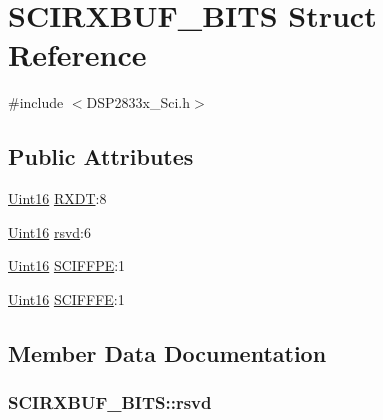 \hypertarget{struct_s_c_i_r_x_b_u_f___b_i_t_s}{}\section{S\+C\+I\+R\+X\+B\+U\+F\+\_\+\+B\+I\+T\+S Struct Reference}
\label{struct_s_c_i_r_x_b_u_f___b_i_t_s}


{\ttfamily \#include $<$D\+S\+P2833x\+\_\+\+Sci.\+h$>$}

\subsection*{Public Attributes}
\begin{DoxyCompactItemize}
\item 
\hyperlink{_d_s_p2833x___device_8h_a59a9f6be4562c327cbfb4f7e8e18f08b}{Uint16} \hyperlink{struct_s_c_i_r_x_b_u_f___b_i_t_s_ad2631cf7cb2d2416642c781944964633}{R\+X\+D\+T}\+:8
\item 
\hyperlink{_d_s_p2833x___device_8h_a59a9f6be4562c327cbfb4f7e8e18f08b}{Uint16} \hyperlink{struct_s_c_i_r_x_b_u_f___b_i_t_s_a134834a896673cca9281cb0534d024ac}{rsvd}\+:6
\item 
\hyperlink{_d_s_p2833x___device_8h_a59a9f6be4562c327cbfb4f7e8e18f08b}{Uint16} \hyperlink{struct_s_c_i_r_x_b_u_f___b_i_t_s_aa759f441f29b63c2f16820c5823a2b41}{S\+C\+I\+F\+F\+P\+E}\+:1
\item 
\hyperlink{_d_s_p2833x___device_8h_a59a9f6be4562c327cbfb4f7e8e18f08b}{Uint16} \hyperlink{struct_s_c_i_r_x_b_u_f___b_i_t_s_af6a12445c5713a479b1d78e5e7389814}{S\+C\+I\+F\+F\+F\+E}\+:1
\end{DoxyCompactItemize}


\subsection{Member Data Documentation}
\hypertarget{struct_s_c_i_r_x_b_u_f___b_i_t_s_a134834a896673cca9281cb0534d024ac}{}
\subsubsection[{rsvd}]{ S\+C\+I\+R\+X\+B\+U\+F\+\_\+\+B\+I\+T\+S\+::rsvd}\label{struct_s_c_i_r_x_b_u_f___b_i_t_s_a134834a896673cca9281cb0534d024ac}
\hypertarget{struct_s_c_i_r_x_b_u_f___b_i_t_s_ad2631cf7cb2d2416642c781944964633}{}
